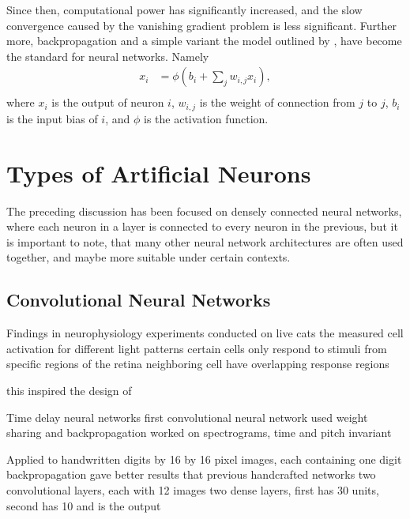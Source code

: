 Since then, computational power has significantly increased, and the slow
convergence caused by the vanishing gradient problem is less significant.
Further more, backpropagation and a simple variant the model outlined by
\cite{McClelland:1986:Parallel}, have become the standard for neural networks.
Namely
\begin{align*}
    x_i &= \phi\left(b_i + \sum_j w_{i,j} x_i\right),\\
\end{align*}
where $x_i$ is the output of neuron $i$, $w_{i,j}$ is the weight of connection
from $j$ to $j$, $b_i$ is the input bias of $i$, and $\phi$ is the activation
function.


\section{Types of Artificial Neurons}

The preceding discussion has been focused on densely connected neural
networks, where each neuron in a layer is connected to every neuron in the
previous, but it is important to note, that many other neural network
architectures are often used together, and maybe more suitable under certain
contexts.


\subsection{Convolutional Neural Networks}

Findings in neurophysiology
\cite{Hubel:1959:Receptive}
experiments conducted on live cats the measured cell activation for different
light patterns
certain cells only respond to stimuli from specific regions of the retina
neighboring cell have overlapping response regions

this inspired the design of \cite{Fukushima:1980:Neocognitron}

Time delay neural networks \cite{Waibel:1989:Phoneme}
first convolutional neural network
used weight sharing and backpropagation
worked on spectrograms, time and pitch invariant

Applied to handwritten digits by \cite{LeCun:1989:Backpropagation}
16 by 16 pixel images, each containing one digit
backpropagation gave better results that previous handcrafted networks
two convolutional layers, each with 12 images
two dense layers, first has 30 units, second has 10 and is the output

